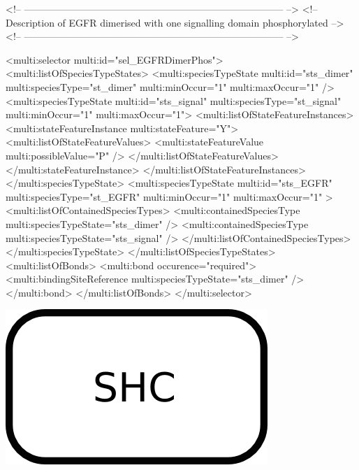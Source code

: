 \begin{example}
<!-- -------------------------------------------------------------------------------- -->
<!-- Description of EGFR dimerised with one signalling domain phosphorylated          --> 
<!-- -------------------------------------------------------------------------------- -->

      <multi:selector multi:id="sel_EGFRDimerPhos">
        <multi:listOfSpeciesTypeStates>
          <multi:speciesTypeState multi:id="sts_dimer" multi:speciesType="st_dimer" 
                                   multi:minOccur="1" multi:maxOccur="1" />
          <multi:speciesTypeState multi:id="sts_signal" multi:speciesType="st_signal" 
                                   multi:minOccur="1" multi:maxOccur="1">
            <multi:listOfStateFeatureInstances>
              <multi:stateFeatureInstance multi:stateFeature="Y">
                <multi:listOfStateFeatureValues>
                  <multi:stateFeatureValue multi:possibleValue="P" />
                </multi:listOfStateFeatureValues>
              </multi:stateFeatureInstance>
            </multi:listOfStateFeatureInstances>
          </multi:speciesTypeState>
          <multi:speciesTypeState multi:id="sts_EGFR" multi:speciesType="st_EGFR" 
                                   multi:minOccur="1" multi:maxOccur="1" >
            <multi:listOfContainedSpeciesTypes>
              <multi:containedSpeciesType multi:speciesTypeState="sts_dimer" /> 
              <multi:containedSpeciesType multi:speciesTypeState="sts_signal" /> 
            </multi:listOfContainedSpeciesTypes>            
          </multi:speciesTypeState>
        </multi:listOfSpeciesTypeStates>
        <multi:listOfBonds>
          <multi:bond occurence="required">
            <multi:bindingSiteReference multi:speciesTypeState="sts_dimer" />
          </multi:bond>
        </multi:listOfBonds>
      </multi:selector>
\end{example}

\includegraphics{figs/pngs/sel_freeSHC.png}

